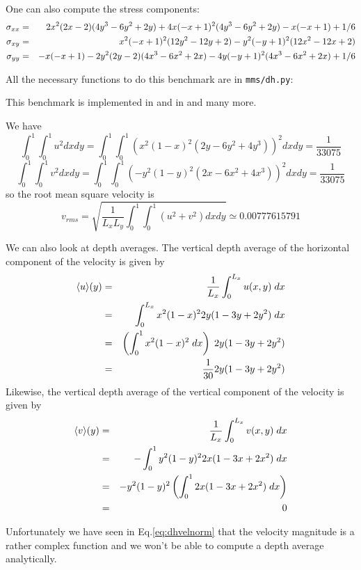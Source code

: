 One can also compute the stress components:
\begin{eqnarray}
\sigma_{xx} &=&  2x^2(2x - 2)(4y^3 - 6y^2 + 2y) + 4x(-x + 1)^2(4y^3 - 6y^2 + 2y) - x(-x + 1) + 1/6 \nonumber\\
\sigma_{xy} &=&  x^2(-x + 1)^2(12y^2 - 12y + 2) - y^2(-y + 1)^2(12x^2 - 12x + 2) \nonumber\\
\sigma_{yy} &=&  -x(-x + 1) - 2y^2(2y - 2)(4x^3 - 6x^2 + 2x) - 4y(-y + 1)^2(4x^3 - 6x^2 + 2x) + 1/6\nonumber
\end{eqnarray}

All the necessary functions to do this benchmark are in {\tt mms/dh.py}:


This benchmark is implemented in \aspect{} \cite{aspectmanual} and in  and many more.

We have
\[
\int_0^1 \int_0^1 u^2 dxdy=
\int_0^1 \int_0^1 ( x^2(1- x)^2 (2y - 6y^2 + 4y^3)  )^2 dx dy = \frac{1}{33075}
\]
\[
\int_0^1 \int_0^1 v^2 dxdy=
\int_0^1 \int_0^1 ( -y^2 (1 - y)^2 (2x - 6x^2 + 4x^3) )^2 dx dy = \frac{1}{33075}
\]
so the root mean square velocity is  
\[
v_{rms} = \sqrt{ \frac{1}{L_x L_y}  \int_0^1 \int_0^1 (u^2+v^2) dx dy } \simeq 0.00777615791
\]

We can also look at depth averages. The vertical depth average of the horizontal component
of the velocity is given by
\begin{eqnarray}
\langle u \rangle (y) 
&=& \frac{1}{L_x} \int_0^{L_x} u(x,y)\; dx \nonumber\\
&=& \int_0^{L_x} x^2(1-x)^2 2y (1-3y+2y^2) \; dx \nonumber\\
&=& \left( \int_0^{1} x^2(1-x)^2 \; dx \right) \;   2y (1-3y+2y^2)  \nonumber\\
&=& \frac{1}{30}2y (1-3y+2y^2) 
\end{eqnarray}
Likewise, the vertical depth average of the vertical component of the velocity is given by
\begin{eqnarray}
\langle v \rangle (y) 
&=& \frac{1}{L_x} \int_0^{L_x} v(x,y)\; dx \nonumber\\
&=& - \int_0^{1} y^2 (1 - y)^2 2x (1-3x+2x^2)  \; dx \nonumber\\
&=& - y^2 (1 - y)^2  \left( \int_0^{1}  2x (1-3x+2x^2)  \; dx \right) \nonumber\\
&=& 0 
\end{eqnarray}

Unfortunately we have seen in Eq.\eqref{eq:dhvelnorm} that the velocity magnitude is 
a rather complex function and we won't be able to compute a depth average analytically.




